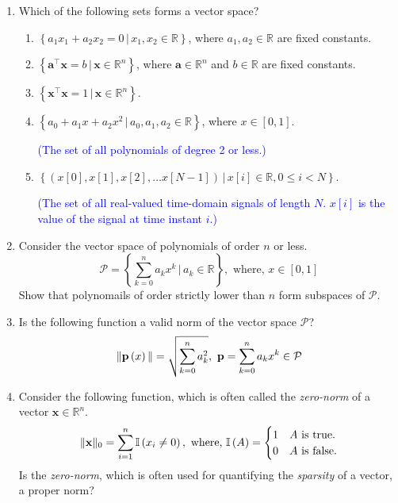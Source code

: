 \documentclass[
11pt, %
a4paper, %
oneside, %
headinclude,footinclude, %
BCOR5mm, %
]{scrartcl}
\begin{document}
\begin{enumerate}

\item Which of the following sets forms a vector space?
\begin{enumerate}
	\item $\left\{ a_1x_1 + a_2 x_2 = 0 \, \vert \, x_1, x_2 \in \mathbb{R} \right\}$, where $a_1, a_2 \in \mathbb{R}$ are fixed constants.
	\item $\left\{ \mathbf{a}^\top \mathbf{x} = b \, \vert \, \mathbf{x} \in \mathbb{R}^n \right\}$, where $\mathbf{a} \in \mathbb{R}^n$ and $b \in \mathbb{R}$ are fixed constants.
	\item $\left\{ \mathbf{x}^\top \mathbf{x} = 1 \, \vert \, \mathbf{x} \in \mathbb{R}^n \right\}$.
	\item $\left\{ a_0 + a_1x + a_2x^2 \, \vert \, a_0, a_1, a_2 \in \mathbb{R} \right\}$, where $x \in \left[0, 1\right]$.

	\textcolor{blue}{(\small{The set of all polynomials of degree 2 or less.})}

	\item $\left\{ \left(x[0], x[1], x[2], \ldots x[N-1]\right) \, \vert \, x[i] \in \mathbb{R}, 0 \leq i < N \right\}$.
	
	\textcolor{blue}{(\small{The set of all real-valued time-domain signals of length $N$. $x[i]$ is the value of the signal at time instant $i$.})}
\end{enumerate}

\item Consider the vector space of polynomials of order $n$ or less.
\[ \mathcal{P} = \left\{ \sum_{k=0}^n a_k x^k \, \bigg\vert \, a_k \in \mathbb{R} \right\}, \,\, \text{where, } x \in \left[0, 1\right] \]
Show that polynomails of order strictly lower than $n$ form subspaces of $\mathcal{P}$.

\item Is the following function a valid norm of the vector space $\mathcal{P}$?
\[ \Vert \mathbf{p}\left( x\right) \Vert = \sqrt{\sum_{k=0}^{n} a_k^2 }, \,\, \mathbf{p} = \sum_{k=0}^n a_kx^k \in \mathcal{P} \]

\item Consider the following function, which is often called the \textit{zero-norm} of a vector $\mathbf{x} \in \mathbb{R}^n$.
\[ \Vert \mathbf{x} \Vert_0 = \sum_{i=1}^n \mathbb{I}\left( x_i \neq 0\right), \,\, \text{where, } \mathbb{I}\left( A\right) = \begin{cases} 1 & A \text{ is true.} \\ 0 & A \text{ is false.}  \end{cases}  \] 
Is the \textit{zero-norm}, which is often used for quantifying the \textit{sparsity} of a vector, a proper norm?


\end{enumerate}
\end{document}
